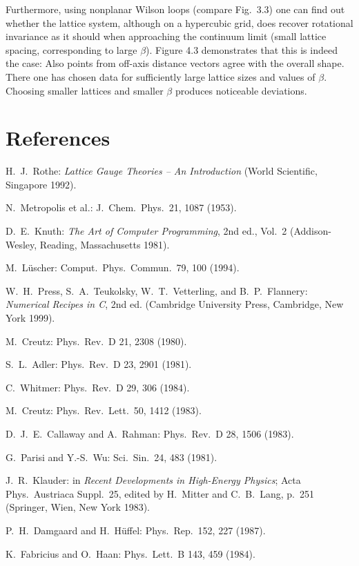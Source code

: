 Furthermore, using nonplanar Wilson loops (compare Fig.~3.3) one can
find out whether the lattice system, although on a hypercubic grid, does recover rotational invariance as it should when approaching the continuum limit
(small lattice spacing, corresponding to large $\beta$). Figure 4.3 demonstrates that
this is indeed the case: Also points from off-axis distance vectors agree with
the overall shape. There one has chosen data for sufficiently large lattice sizes
and values of $\beta$. Choosing smaller lattices and smaller $\beta$ produces noticeable
deviations.

\section*{References}

\begin{enumerate}[label={[\arabic*]}]
  \item H.~J.~Rothe: \emph{Lattice Gauge Theories -- An Introduction} (World
        Scientific, Singapore 1992).
  \item N.~Metropolis et al.: J.~Chem.~Phys.~21, 1087 (1953).
  \item D.~E.~Knuth: \emph{The Art of Computer Programming}, 2nd ed., Vol.~2
        (Addison-Wesley, Reading, Massachusetts 1981).
  \item M.~L\"uscher: Comput.~Phys.~Commun.~79, 100 (1994).
  \item W.~H.~Press, S.~A.~Teukolsky, W.~T.~Vetterling, and B.~P.~Flannery:
        \emph{Numerical Recipes in C}, 2nd ed. (Cambridge University Press,
        Cambridge, New York 1999).
  \item M.~Creutz: Phys.~Rev.~D 21, 2308 (1980).
  \item S.~L.~Adler: Phys.~Rev.~D 23, 2901 (1981).
  \item C.~Whitmer: Phys.~Rev.~D 29, 306 (1984).
  \item M.~Creutz: Phys.~Rev.~Lett.~50, 1412 (1983).
  \item D.~J.~E.~Callaway and A.~Rahman: Phys.~Rev.~D 28, 1506 (1983).
  \item G.~Parisi and Y.-S.~Wu: Sci.~Sin.~24, 483 (1981).
  \item J.~R.~Klauder: in \emph{Recent Developments in High-Energy Physics};
        Acta Phys.~Austriaca Suppl.~25, edited by H.~Mitter and C.~B.~Lang,
        p.~251 (Springer, Wien, New York 1983).
  \item P.~H.~Damgaard and H.~H\"uffel: Phys.~Rep.~152, 227 (1987).
  \item K.~Fabricius and O.~Haan: Phys.~Lett.~B 143, 459 (1984).

\end{enumerate}
